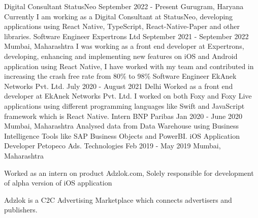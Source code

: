 

\begin{cventries}

\cventry
    {Digital Consultant} %
    {StatusNeo} %
    {September 2022 - Present} %
    {Gurugram, Haryana} %
    {
        Currently I am working as a Digital Consultant at StatusNeo, developing applications using React Native, TypeScript, React-Native-Paper and other libraries.
    }
\vspace{1.0em}
\cventry
    {Software Engineer} %
    {Expertrons Ltd} %
    {September 2021 - September 2022} %
    {Mumbai, Maharashtra} %
    {
        I was working as a front end developer at Expertrons, developing, enhancing and implementing new features on iOS and Android application using React Native, I have worked with my team and contributed in increasing the crash free rate from 80\% to 98\%
    }
\vspace{1.0em}
\cventry
    {Software Engineer} %
    {EkAnek Networks Pvt. Ltd.} %
    {July 2020 - August 2021} %
    {Delhi} %
    {
        Worked as a front end developer at EkAnek Networks Pvt. Ltd. I worked on both Foxy and Foxy Live applications using different programming languages like Swift and JavaScript framework which is React Native.
    }
\vspace{1.0em}
\cventry
    {Intern} %
    {BNP Paribas} %
    {Jan 2020 - June 2020} %
    {Mumbai, Maharashtra} %
    {
        Analysed data from Data Warehouse using Business Intelligence Tools like SAP Business Objects and PowerBI.
    }
  \vspace{1.0em}
  \cventry
    {iOS Application Developer} %
    {Petopeco Ads. Technologies} %
    {Feb 2019 - May 2019} %
    {Mumbai, Maharashtra} %
    {
      \begin{cvitems} %
        \item Worked as an intern on product Adzlok.com, Solely responsible for development of alpha version of iOS application
        \item Adzlok is a C2C Advertising Marketplace which connects advertisers and publishers.
      \end{cvitems}
    }
\end{cventries}
